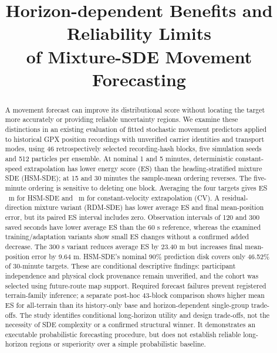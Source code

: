 

\title{Horizon-dependent Benefits and Reliability Limits\\of Mixture-SDE Movement Forecasting}

\pagestyle{plain}
\maketitle
\begin{abstract}
A movement forecast can improve its distributional score without locating
the target more accurately or providing reliable uncertainty regions. We
examine these distinctions in an existing evaluation of fitted stochastic
movement predictors applied to historical GPX position recordings with
unverified carrier identities and transport modes, using 46 retrospectively selected recording-hash
blocks, five simulation seeds and 512 particles per ensemble. At nominal
1 and 5 minutes, deterministic constant-speed extrapolation has lower
energy score (ES) than the heading-stratified mixture SDE (HSM-SDE); at 15 and 30 minutes the sample-mean ordering reverses. The five-minute ordering is sensitive to deleting one block.
Averaging the four targets gives ES \FullES\ m for HSM-SDE and
\InertialES\ m for constant-velocity extrapolation (CV). A residual-direction
mixture variant (RDM-SDE) has lower average ES and final
mean-position error, but its paired ES interval includes zero. Observation
intervals of 120 and 300 saved seconds have lower average ES than the
60 s reference, whereas the examined training/adaptation variants show
small ES changes without a confirmed added decrease. The 300 s
variant reduces average ES by 23.40 m but increases final mean-position
error by 9.64 m. HSM-SDE's nominal 90\% prediction disk
covers only 46.52\% of 30-minute targets. These are conditional descriptive
findings: participant independence and physical clock provenance remain
unverified, and the cohort was selected using future-route map support.
Required forecast failures prevent registered terrain-family inference;
a separate post-hoc 43-block comparison shows higher mean ES for all-terrain
than its history-only base and horizon-dependent single-group trade-offs. The study
identifies conditional long-horizon utility and design trade-offs, not the
necessity of SDE complexity or a confirmed structural winner. It demonstrates
an executable probabilistic forecasting procedure, but does not establish
reliable long-horizon regions or superiority over a simple probabilistic baseline.
\end{abstract}

